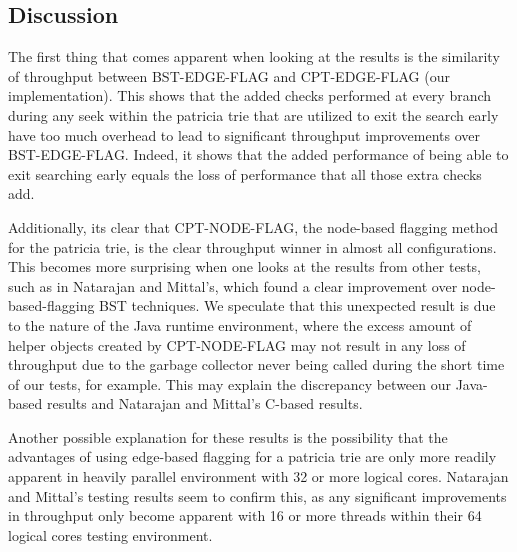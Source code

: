 \documentclass[conference]{IEEEtran}
\begin{document}
\subsection{Discussion}
The first thing that comes apparent when looking at the results is the similarity of throughput between BST-EDGE-FLAG and CPT-EDGE-FLAG (our implementation). This shows that the added checks performed at every branch during any seek within the patricia trie that are utilized to exit the search early have too much overhead to lead to significant throughput improvements over BST-EDGE-FLAG. Indeed, it shows that the added performance of being able to exit searching early equals the loss of performance that all those extra checks add.
\par
Additionally, its clear that CPT-NODE-FLAG, the node-based flagging method for the patricia trie, is the clear throughput winner in almost all configurations. This becomes more surprising when one looks at the results from other tests, such as in Natarajan and Mittal's\cite{Natarajan2014}, which found a clear improvement over node-based-flagging BST techniques. We speculate that this unexpected result is due to the nature of the Java runtime environment, where the excess amount of helper objects created by CPT-NODE-FLAG may not result in any loss of throughput due to the garbage collector never being called during the short time of our tests, for example. This may explain the discrepancy between our Java-based results and Natarajan and Mittal's C-based results. 
\par
Another possible explanation for these results is the possibility that the advantages of using edge-based flagging for a patricia trie are only more readily apparent in heavily parallel environment with 32 or more logical cores. Natarajan and Mittal's testing results\cite{Natarajan2014} seem to confirm this, as any significant improvements in throughput only become apparent with 16 or more threads within their 64 logical cores testing environment. 
\par
\end{document}
